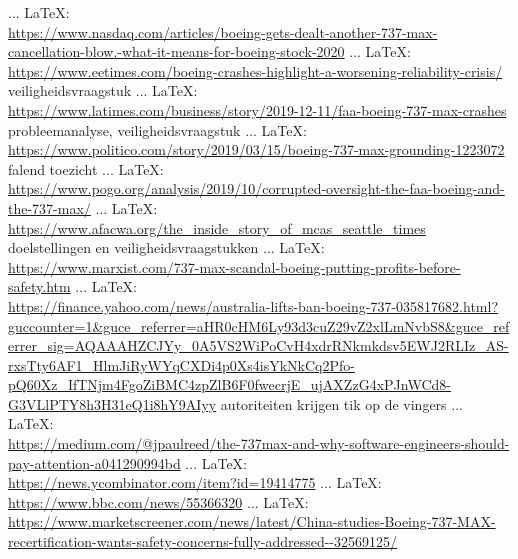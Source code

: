 \begin{thebibliography}{99}
{{{ ... \LaTeX:\\ \url{https://www.nasdaq.com/articles/boeing-gets-dealt-another-737-max-cancellation-blow.-what-it-means-for-boeing-stock-2020}
 ... \LaTeX:\\ \url{https://www.eetimes.com/boeing-crashes-highlight-a-worsening-reliability-crisis/}
veiligheidsvraagstuk
 ... \LaTeX:\\ \url{https://www.latimes.com/business/story/2019-12-11/faa-boeing-737-max-crashes}
probleemanalyse, veiligheidsvraagstuk
 ... \LaTeX:\\ \url{https://www.politico.com/story/2019/03/15/boeing-737-max-grounding-1223072}
falend toezicht
 ... \LaTeX:\\ \url{https://www.pogo.org/analysis/2019/10/corrupted-oversight-the-faa-boeing-and-the-737-max/}
 ... \LaTeX:\\ \url{https://www.afacwa.org/the_inside_story_of_mcas_seattle_times}
doelstellingen en veiligheidsvraagstukken
 ... \LaTeX:\\ \url{https://www.marxist.com/737-max-scandal-boeing-putting-profits-before-safety.htm}
 ... \LaTeX:\\ \url{https://finance.yahoo.com/news/australia-lifts-ban-boeing-737-035817682.html?guccounter=1&guce_referrer=aHR0cHM6Ly93d3cuZ29vZ2xlLmNvbS8&guce_referrer_sig=AQAAAHZCJYy_0A5VS2WiPoCvH4xdrRNkmkdsv5EWJ2RLIz_AS-rxsTty6AF1_HlmJiRyWYqCXDi4p0Xs4isYkNkCq2Pfo-pQ60Xz_IfTNjm4FgoZiBMC4zpZlB6F0fwecrjE_ujAXZzG4xPJnWCd8-G3VLlPTY8h3H31eQ1i8hY9AIyy}
autoriteiten krijgen tik op de vingers
 ... \LaTeX:\\ \url{https://medium.com/@jpaulreed/the-737max-and-why-software-engineers-should-pay-attention-a041290994bd}
 ... \LaTeX:\\ \url{https://news.ycombinator.com/item?id=19414775}
 ... \LaTeX:\\ \url{https://www.bbc.com/news/55366320}
 ... \LaTeX:\\ \url{https://www.marketscreener.com/news/latest/China-studies-Boeing-737-MAX-recertification-wants-safety-concerns-fully-addressed--32569125/}
}}}
\end{thebibliography}
